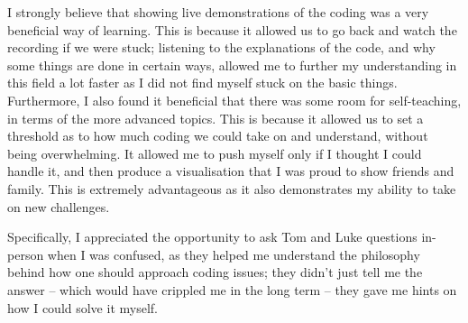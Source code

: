 \documentclass[
]{book}
\begin{document}
I strongly believe that showing live demonstrations of the coding was a very beneficial way of learning. This is because it allowed us to go back and watch the recording if we were stuck; listening to the explanations of the code, and why some things are done in certain ways, allowed me to further my understanding in this field a lot faster as I did not find myself stuck on the basic things. Furthermore, I also found it beneficial that there was some room for self-teaching, in terms of the more advanced topics. This is because it allowed us to set a threshold as to how much coding we could take on and understand, without being overwhelming. It allowed me to push myself only if I thought I could handle it, and then produce a visualisation that I was proud to show friends and family. This is extremely advantageous as it also demonstrates my ability to take on new challenges.

Specifically, I appreciated the opportunity to ask Tom and Luke questions in-person when I was confused, as they helped me understand the philosophy behind how one should approach coding issues; they didn't just tell me the answer -- which would have crippled me in the long term -- they gave me hints on how I could solve it myself.

  
\end{document}
